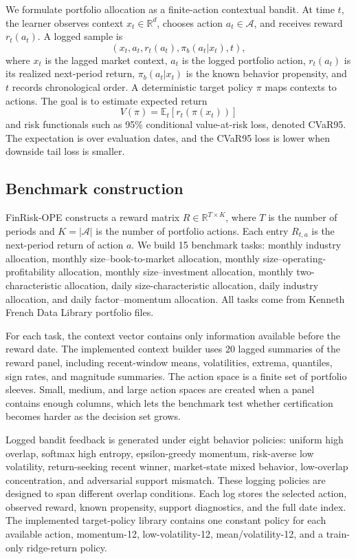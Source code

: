 \documentclass[conference]{IEEEtran}
\begin{document}
We formulate portfolio allocation as a finite-action contextual bandit. At time $t$, the learner observes context $x_t \in \mathbb{R}^d$, chooses action $a_t \in \mathcal{A}$, and receives reward $r_t(a_t)$. A logged sample is
\begin{equation}
    (x_t, a_t, r_t(a_t), \pi_b(a_t|x_t), t),
\end{equation}
where $x_t$ is the lagged market context, $a_t$ is the logged portfolio action, $r_t(a_t)$ is its realized next-period return, $\pi_b(a_t|x_t)$ is the known behavior propensity, and $t$ records chronological order. A deterministic target policy $\pi$ maps contexts to actions. The goal is to estimate expected return
\begin{equation}
    V(\pi)=\mathbb{E}_{t}[r_t(\pi(x_t))]
\end{equation}
and risk functionals such as 95\% conditional value-at-risk loss, denoted CVaR95. The expectation is over evaluation dates, and the CVaR95 loss is lower when downside tail loss is smaller.

\subsection{Benchmark construction}

FinRisk-OPE constructs a reward matrix $R \in \mathbb{R}^{T \times K}$, where $T$ is the number of periods and $K=|\mathcal{A}|$ is the number of portfolio actions. Each entry $R_{t,a}$ is the next-period return of action $a$. We build 15 benchmark tasks: monthly industry allocation, monthly size--book-to-market allocation, monthly size--operating-profitability allocation, monthly size--investment allocation, monthly two-characteristic allocation, daily size-characteristic allocation, daily industry allocation, and daily factor--momentum allocation. All tasks come from Kenneth French Data Library portfolio files.

For each task, the context vector contains only information available before the reward date. The implemented context builder uses 20 lagged summaries of the reward panel, including recent-window means, volatilities, extrema, quantiles, sign rates, and magnitude summaries. The action space is a finite set of portfolio sleeves. Small, medium, and large action spaces are created when a panel contains enough columns, which lets the benchmark test whether certification becomes harder as the decision set grows.

Logged bandit feedback is generated under eight behavior policies: uniform high overlap, softmax high entropy, epsilon-greedy momentum, risk-averse low volatility, return-seeking recent winner, market-state mixed behavior, low-overlap concentration, and adversarial support mismatch. These logging policies are designed to span different overlap conditions. Each log stores the selected action, observed reward, known propensity, support diagnostics, and the full date index. The implemented target-policy library contains one constant policy for each available action, momentum-12, low-volatility-12, mean/volatility-12, and a train-only ridge-return policy.
\end{document}
